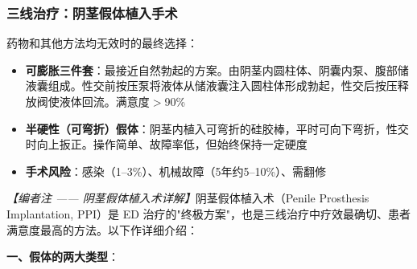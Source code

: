 \subsubsection{三线治疗：阴茎假体植入手术}
\label{subsec:penile_prosthesis}

药物和其他方法均无效时的最终选择：
\begin{itemize}[leftmargin=2cm]
	\item \textbf{可膨胀三件套}：最接近自然勃起的方案。由阴茎内圆柱体、阴囊内泵、腹部储液囊组成。性交前按压泵将液体从储液囊注入圆柱体形成勃起，性交后按压释放阀使液体回流。满意度$>$90\%
	\item \textbf{半硬性（可弯折）假体}：阴茎内植入可弯折的硅胶棒，平时可向下弯折，性交时向上扳正。操作简单、故障率低，但始终保持一定硬度
	\item \textbf{手术风险}：感染（1--3\%）、机械故障（5年约5--10\%）、需翻修
\end{itemize}

\noindent\textit{【编者注 —— 阴茎假体植入术详解】}阴茎假体植入术（Penile Prosthesis Implantation, PPI）是 ED 治疗的"终极方案"，也是三线治疗中疗效最确切、患者满意度最高的方法。以下作详细介绍：

\vspace{0.5em}
\noindent\textbf{一、假体的两大类型}：

